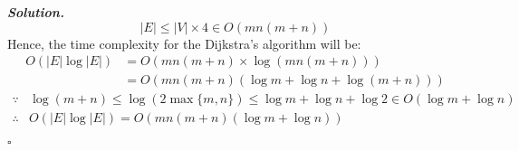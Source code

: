 \documentclass[12pt, a4paper, UTF8]{article}
\newenvironment{solution}[1][\it{Solution}]{\textbf{#1. }\\}{\begin{flushright}$\square$\end{flushright}}
\begin{document}
\begin{enumerate}
\begin{solution}
                $$|E| \le |V| \times 4 \in O(mn(m + n))$$
                Hence, the time complexity for the Dijkstra's algorithm will be:
                \begin{align*}
                    O(|E|\log|E|) &= O(mn(m + n) \times \log{(mn(m + n))})\\
                                  &= O(mn(m + n)(\log{m} + \log{n} + \log{(m + n)}))
                \end{align*}
                \begin{align*}
                    \because& \log{(m + n)} \le \log{(2 \max\{m, n\}) \le \log{m} + \log{n} + \log{2} \in O(\log{m} + \log{n})}\\
                    \therefore& O(|E|\log|E|) = O(mn(m + n)(\log{m} + \log{n}))
                \end{align*}
                
                \end{solution}
        \end{enumerate}
\end{document}
